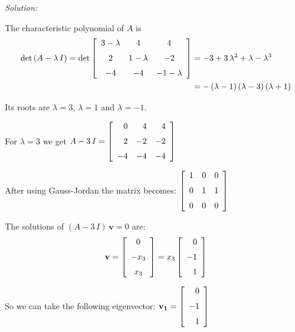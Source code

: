 \documentclass[12pt]{article}
\newcommand{\solution}[2]{\ifthenelse{\boolean{showsol}}%
{\vskip10pt\noindent\emph{Solution:}\vskip10pt #2}{\vskip #1}}
\begin{document}
\solution{2.5in}{\par
The characteristic polynomial of $A$ is
\[
\begin{aligned}
\det\,(A-\lambda\,I) = 
\det\left [\begin {array}{ccc} 3-\lambda&4&4\\
\noalign{\medskip}2&1-\lambda&-2
\\\noalign{\medskip}-4&-4&-1-\lambda\end {array}\right ] 
&= -3+3\,{\lambda}^{2}+\lambda-{\lambda}^{3} \\
&=
-\left (\lambda-1\right )\left (\lambda-3\right )\left (\lambda+1
\right )
\end{aligned}
\]

Its roots are $\lambda=3$, $\lambda=1$ and $\lambda=-1$.

For $\lambda=3$ we get
$\displaystyle{
A - 3\,I = 
\left [\begin {array}{rrr} 0&4&4\\\noalign{\medskip}2&-2&-2
\\\noalign{\medskip}-4&-4&-4\end {array}\right ]
}$

After using Gauss-Jordan the matrix becomes:
$\displaystyle{
\left [\begin {array}{ccc} 1&0&0\\\noalign{\medskip}0&1&1
\\\noalign{\medskip}0&0&0\end {array}\right ]
}$

The solutions of $(A-3\,I)\,\mathbf{v} = 0$ 
are:
\[
\mathbf{v} = 
\left [\begin {array}{c} 0\\\noalign{\medskip}-x_{{3}}
\\\noalign{\medskip}x_{{3}}\end {array}\right ]
=
x_3 \left [\begin {array}{r} 0\\\noalign{\medskip}-1\\\noalign{\medskip}1
\end {array}\right ]
\]

So we can take the following eigenvector:
$\displaystyle{
\mathbf{v_1} = 
\left [\begin {array}{r} 0\\\noalign{\medskip}-1\\\noalign{\medskip}1
\end {array}\right ]
}$



}
\end{document}
